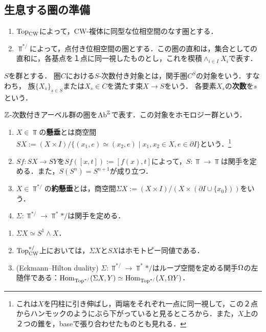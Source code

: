 \documentclass[uplatex,dvipdfmx]{jsreport}
\begin{document}
\subsection{生息する圏の準備}

\begin{notation}\mbox{}
    \begin{enumerate}
        \item $\mathrm{Top}_{\mathrm{CW}}$によって，CW-複体に同型な位相空間のなす圏とする．
        \item $\Top^{*/}$によって，点付き位相空間の圏とする．この圏の直和は，集合としての直和に，各基点を１点に同一視したものとし，これを楔積$\wedge_{i\in I}X_i$で表す．
    \end{enumerate}
\end{notation}

\begin{definition}
    $S$を群とする．
    圏$C$における$S$-次数付き対象とは，関手圏$C^S$の対象をいう．すなわち，
    族$\{X_s\}_{s\in S}$または$X_s\in C$を満たす束$X\to S$をいう．
    各要素$X_s$の\textbf{次数}を$s$という．
\end{definition}
\begin{example}
    $\mathbb{Z}$-次数付きアーベル群の圏を$\mathrm{Ab}^{\mathbb{Z}}$で表す．この対象をホモロジー群という．
\end{example}

\begin{definition}\mbox{}\label{def-suspension}
    \begin{enumerate}
        \item $X\in\Top$の\textbf{懸垂}とは商空間$SX:=(X\times I)/\{(x_1,e)\simeq(x_2,e)\mid x_1,x_2\in X,e\in\partial I\}$という．\footnote{これは$X$を円柱に引き伸ばし，両端をそれぞれ一点に同一視して，この２点からハンモックのようにぶら下がっていると見るところから．また，$X$上の２つの錐を，baseで張り合わせたものとも見れる．}
        \item $Sf:SX\to SY$を$Sf([x,t]):=[f(x),t]$によって，$S:\Top\to\Top$は関手を定める．また，$S(S^n)=S^{n+1}$が成り立つ．
        \item $X\in\Top^{*/}$の\textbf{約懸垂}とは，商空間$\Sigma X:=(X\times I)/(X\times(\partial I\cup\{x_0\}))$をいう．
        \item $\Sigma:\Top^{*/}\to\Top^*{*/}$は関手を定める．
    \end{enumerate}
\end{definition}

\begin{lemma}[約懸垂の表示]\mbox{}
    \begin{enumerate}
        \item $\Sigma X\simeq S^1\wedge X$．
        \item $\mathrm{Top}_{\mathrm{CW}}^{*/}$上においては，$\Sigma X$と$SX$はホモトピー同値である．
        \item (Eckmann–Hilton duality) $\Sigma:\Top^{*/}\to\Top^*{*/}$はループ空間を定める関手$\Omega$の左随伴である：$\mathrm{Hom}_{\mathrm{Top}^{*/}}(\Sigma X,Y)\simeq\mathrm{Hom}_{\mathrm{Top}^{*/}}(X,\Omega Y)$．
    \end{enumerate}
\end{lemma}
\end{document}
